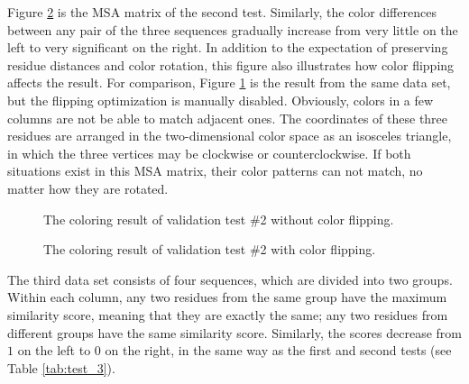 Figure \ref{fig:test_2} is the MSA matrix of the second test. Similarly, the color differences between any pair of the three sequences gradually increase from very little on the left to very significant on the right. In addition to the expectation of preserving residue distances and color rotation, this figure also illustrates how color flipping affects the result. For comparison, Figure \ref{fig:test_2a} is the result from the same data set, but the flipping optimization is manually disabled. Obviously, colors in a few columns are not be able to match adjacent ones. The coordinates of these three residues are arranged in the two-dimensional color space as an isosceles triangle, in which the three vertices may be clockwise or counterclockwise. If both situations exist in this MSA matrix, their color patterns can not match, no matter how they are rotated. 

\begin{figure}[htb]
\caption[Coloring Result of Validation Test \#2 without Flipping]{The coloring result of validation test \#2 without color flipping.}\label{fig:test_2a}
\end{figure}

\begin{figure}[htb]
\caption[Coloring Result of Validation Test \#2 with Flipping]{The coloring result of validation test \#2 with color flipping.}\label{fig:test_2}
\end{figure}

The third data set consists of four sequences, which are divided into two groups. Within each column, any two residues from the same group have the maximum similarity score, meaning that they are exactly the same; any two residues from different groups have the same similarity score. Similarly, the scores decrease from $1$ on the left to $0$ on the right, in the same way as the first and second tests (see Table \ref{tab:test_3}).

